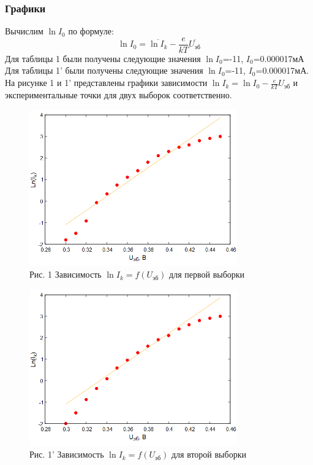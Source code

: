 \subsubsection{Графики}
Вычислим $\ln I_0$ по формуле:
\begin{equation}
\label{eq:12}
    \ln I_0=\overline{\ln I_k}-\frac{e}{kT}\overline{U_{\text{эб}}}
\end{equation}
Для таблицы 1 были получены следующие значения $\ln I_0$=-11, $I_0$=0.000017мА
Для таблицы 1' были получены следующие значения $\ln I_0$=-11, $I_0$=0.000017мА.
На рисунке 1 и 1' представлены графики зависимости $\ln I_k=\ln I_0-\frac{e}{kT}U_{\text{эб}}$ и экспериментальные точки для двух выборок соответственно. 
\begin{figure}[H]
\centering
\includegraphics[width=0.8\textwidth]{График 1.png}
\caption*{Рис. 1 Зависимость $\ln I_k=f(U_{\text{эб}})$ для первой выборки }
\label{fig:gist}
\end{figure}
\begin{figure}[H]
\centering
\includegraphics[width=0.8\textwidth]{График 2.png}
\caption*{Рис. 1' Зависимость $\ln I_k=f(U_{\text{эб}})$ для второй выборки}
\label{fig:gist}
\end{figure}
